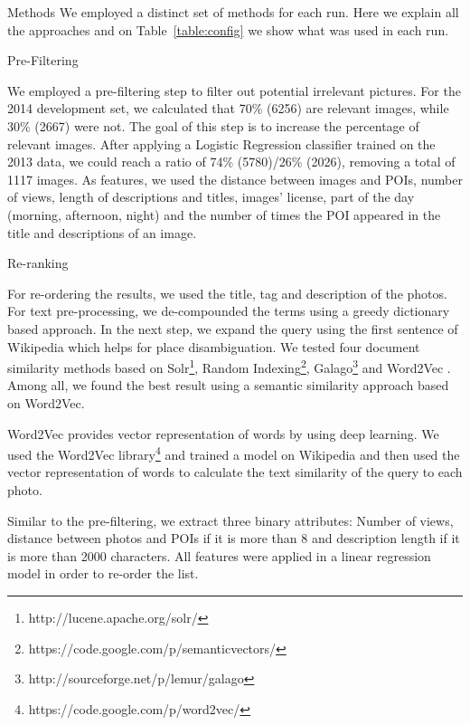 \documentclass{acm_proc_article-me}
\begin{document}
\begin{section}{Methods}
We employed a distinct set of methods for each run. 
Here we explain all the approaches and on Table~\ref{table:config} we show what was used in each run.

\begin{subsection}{Pre-Filtering}

We employed a pre-filtering step to filter out potential irrelevant pictures.
For the 2014 development set, we calculated that 70\% (6256) are relevant images, while 30\% (2667) were not.
The goal of this step is to increase the percentage of relevant images. 
After applying a Logistic Regression classifier trained on the 2013 data, we could reach a ratio of 74\% (5780)/26\% (2026), removing a total of 1117 images. As features, we used the distance between images and POIs, number of views, length of descriptions and titles, images' license, part of the day (morning, afternoon, night) and the number of times the POI appeared in the title and descriptions of an image.

\end{subsection}


\begin{subsection}{Re-ranking}

For re-ordering the results, we used the title, tag and description of the photos. For text pre-processing, we de-compounded the terms using a greedy dictionary based approach. In the next step, we expand the query using the first sentence of Wikipedia which helps for place disambiguation. We tested four document similarity methods based on Solr\footnote{http://lucene.apache.org/solr/}, Random Indexing\footnote{https://code.google.com/p/semanticvectors/}, Galago\footnote{http://sourceforge.net/p/lemur/galago} and Word2Vec \cite{word2vec}. Among all, we found the best result using a semantic similarity approach based on Word2Vec.

Word2Vec provides vector representation of words by using deep learning. We used the Word2Vec library\footnote{https://code.google.com/p/word2vec/} and trained a model on Wikipedia and then used the vector representation of words to calculate the text similarity of the query to each photo.

Similar to the pre-filtering, we extract three binary attributes: Number of views, distance between photos and POIs if it is more than 8 and description length if it is more than 2000 characters. All features were applied in a linear regression model in order to re-order the list.


\end{subsection}
\end{section}
\end{document}

